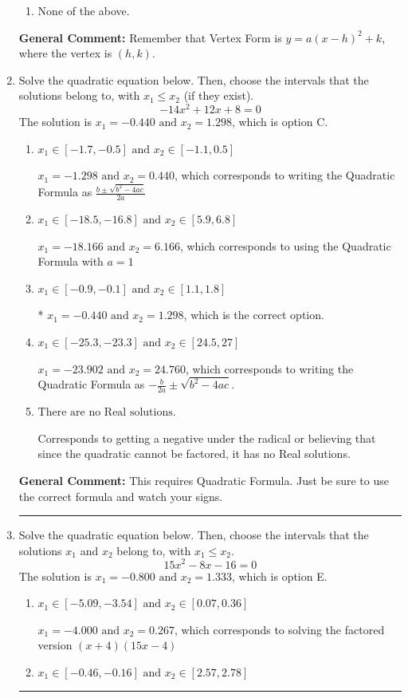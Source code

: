 \documentclass{extbook}[14pt]
\newcommand{\litem}[1]{\item #1

\rule{\textwidth}{0.4pt}}
\begin{document}
\begin{enumerate}
{\begin{enumerate}[label=\Alph*.]
\begin{multicols}{2}
\end{multicols}\item None of the above.\end{enumerate}
\textbf{General Comment:} Remember that Vertex Form is $y = a(x-h)^2+k$, where the vertex is $(h, k)$.
}
\litem{
Solve the quadratic equation below. Then, choose the intervals that the solutions belong to, with $x_1 \leq x_2$ (if they exist).
\[ -14x^{2} +12 x + 8 = 0 \]The solution is \( x_1 = -0.440 \text{ and } x_2 = 1.298 \), which is option C.\begin{enumerate}[label=\Alph*.]
\item \( x_1 \in [-1.7, -0.5] \text{ and } x_2 \in [-1.1, 0.5] \)

 $x_1 = -1.298 \text{ and } x_2 = 0.440$, which corresponds to writing the Quadratic Formula as $\frac{b \pm \sqrt{b^2 - 4ac}}{2a}$
\item \( x_1 \in [-18.5, -16.8] \text{ and } x_2 \in [5.9, 6.8] \)

 $x_1 = -18.166 \text{ and } x_2 = 6.166$, which corresponds to using the Quadratic Formula with $a=1$
\item \( x_1 \in [-0.9, -0.1] \text{ and } x_2 \in [1.1, 1.8] \)

* $x_1 = -0.440 \text{ and } x_2 = 1.298$, which is the correct option.
\item \( x_1 \in [-25.3, -23.3] \text{ and } x_2 \in [24.5, 27] \)

 $x_1 = -23.902 \text{ and } x_2 = 24.760$, which corresponds to writing the Quadratic Formula as $-\frac{b}{2a} \pm \sqrt{b^2 - 4ac}$.
\item \( \text{There are no Real solutions.} \)

Corresponds to getting a negative under the radical or believing that since the quadratic cannot be factored, it has no Real solutions.
\end{enumerate}

\textbf{General Comment:} This requires Quadratic Formula. Just be sure to use the correct formula and watch your signs.
}
\litem{
Solve the quadratic equation below. Then, choose the intervals that the solutions $x_1$ and $x_2$ belong to, with $x_1 \leq x_2$.
\[ 15x^{2} -8 x -16 = 0 \]The solution is \( x_1 = -0.800 \text{ and } x_2 = 1.333 \), which is option E.\begin{enumerate}[label=\Alph*.]
\item \( x_1 \in [-5.09, -3.54] \text{ and } x_2 \in [0.07, 0.36] \)

$x_1 = -4.000 \text{ and } x_2 = 0.267$, which corresponds to solving the factored version $(x + 4)(15x -4)$
\item \( x_1 \in [-0.46, -0.16] \text{ and } x_2 \in [2.57, 2.78] \)


\end{enumerate}}
\end{enumerate}
\end{document}
